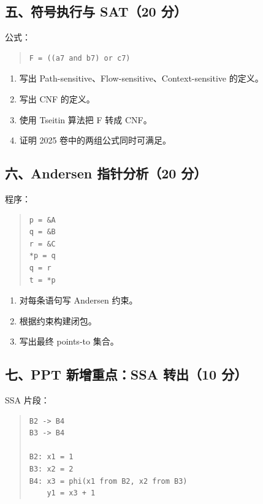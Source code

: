 \documentclass[UTF8,zihao=-4]{ctexart}
\begin{document}
\subsection{五、符号执行与 SAT（20 分）}


公式：


\begin{quote}
\footnotesize
\begin{verbatim}
F = ((a7 and b7) or c7)
\end{verbatim}
\end{quote}


\begin{enumerate}
\item 写出 Path-sensitive、Flow-sensitive、Context-sensitive 的定义。
\item 写出 CNF 的定义。
\item 使用 Tseitin 算法把 F 转成 CNF。
\item 证明 2025 卷中的两组公式同时可满足。
\end{enumerate}


\subsection{六、Andersen 指针分析（20 分）}


程序：


\begin{quote}
\footnotesize
\begin{verbatim}
p = &A
q = &B
r = &C
*p = q
q = r
t = *p
\end{verbatim}
\end{quote}


\begin{enumerate}
\item 对每条语句写 Andersen 约束。
\item 根据约束构建闭包。
\item 写出最终 points-to 集合。
\end{enumerate}


\subsection{七、PPT 新增重点：SSA 转出（10 分）}


SSA 片段：

\begin{quote}
\footnotesize
\begin{verbatim}
B2 -> B4
B3 -> B4

B2: x1 = 1
B3: x2 = 2
B4: x3 = phi(x1 from B2, x2 from B3)
    y1 = x3 + 1
\end{verbatim}
\end{quote}
\end{document}
